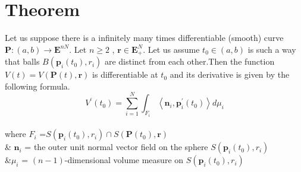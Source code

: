 


\section{Theorem} 
Let us suppose there is a infinitely many times differentiable (smooth) curve  $\mathbf{P}:(a, b) \rightarrow \mathbf{E}^{n N}$. Let $n \geq 2$ , $\mathbf{r} \in \mathbf{E}_{+}^{N}$. Let us assume $t_{0} \in(a, b)$ is such a way that  balls $B\left(\mathbf{p}_{i}\left(t_{0}\right), r_{i}\right)$ are distinct from each other.Then the function $V(t)=V(\mathbf{P}(t), \mathbf{r})$ is differentiable at $t_{0}$ and its derivative is given by the following formula.
$$
V^{\prime}\left(t_{0}\right)=\sum_{i=1}^{N} \int_{F_{i}}\left\langle\mathbf{n}_{i}, \mathbf{p}_{i}^{\prime}\left(t_{0}\right)\right\rangle d \mu_{i}
$$\\
where $F_{i}$ =$S\left(\mathbf{p}_{i}\left(t_{0}\right), r_{i}\right) \cap S\left(\mathbf{P}\left(t_{0}\right), \mathbf{r}\right)$\\
& $\mathbf{n}_{i}$ = the outer unit normal vector field on the sphere $S\left(\mathbf{p}_{i}\left(t_{0}\right), r_{i}\right)$\\
&$\mu_{i}$ = $(n-1)$-dimensional volume measure on $S\left(\mathbf{p}_{i}\left(t_{0}\right), r_{i}\right)$ \\

